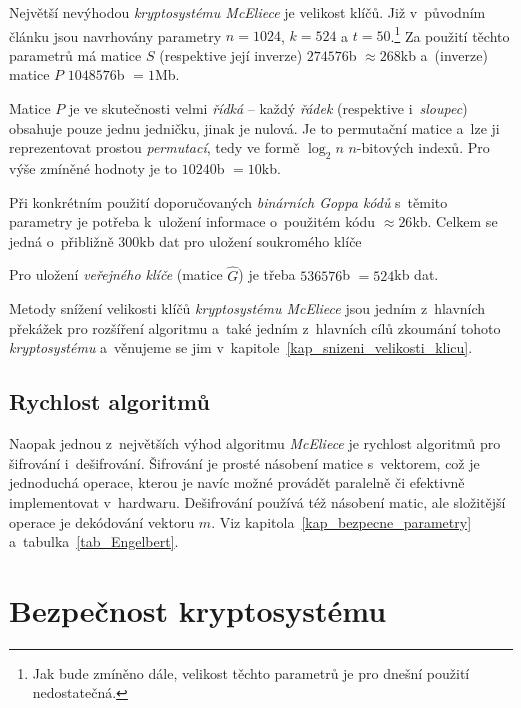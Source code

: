 \documentclass[thesis=M,czech,hidelinks]{FITthesis}[2012/06/26]
\newcommand{\0}{{\textcolor[gray]{0.75}{0}}}
\begin{document}
Největší nevýhodou \emph{kryptosystému McEliece} je velikost klíčů. Již
v~původním článku jsou navrhovány parametry $n=1024$, $k=524$ a
$t=50$.\footnote{
    Jak bude zmíněno dále, velikost těchto parametrů je pro dnešní použití
    nedostatečná.
} Za použití těchto parametrů má matice $S$ (respektive její inverze)
$274576$\;b $\approx 268$\;kb a~(inverze) matice $P$ $1048576$\;b $= 1$\;Mb.

Matice $P$ je ve skutečnosti velmi \emph{řídká} -- každý \emph{řádek}
(respektive i~\emph{sloupec}) obsahuje pouze jednu jedničku, jinak je nulová. Je
to permutační matice a~lze ji reprezentovat prostou \emph{permutací}, tedy ve
formě $\log_2 n$ $n$-bitových indexů. Pro výše zmíněné hodnoty je to $10240$\;b
$=10$\;kb.

Při konkrétním použití doporučovaných \emph{binárních Goppa kódů} s~těmito
parametry je potřeba k~uložení informace o~použitém kódu $\approx 26$\;kb.
Celkem se jedná o~přibližně $300$\;kb dat pro uložení soukromého klíče

Pro uložení \emph{veřejného klíče} (matice $\hat{G}$) je třeba $536576$\;b
$=524$\;kb dat.

Metody snížení velikosti klíčů \emph{kryptosystému McEliece} jsou jedním
z~hlavních překážek pro rozšíření algoritmu a~také jedním z~hlavních cílů
zkoumání tohoto \emph{kryptosystému} a~věnujeme se jim
v~kapitole~\ref{kap_snizeni_velikosti_klicu}.


\subsection{Rychlost algoritmů}

Naopak jednou z~největších výhod algoritmu \emph{McEliece} je rychlost algoritmů
pro šifrování i~dešifrování. Šifrování je prosté násobení matice s~vektorem, což
je jednoduchá operace, kterou je navíc možné provádět paralelně či efektivně
implementovat v~hardwaru. Dešifrování používá též násobení matic, ale složitější
operace je dekódování vektoru $\hat{m}$. Viz
kapitola~\ref{kap_bezpecne_parametry} a~tabulka~\ref{tab_Engelbert}.



\section{Bezpečnost kryptosystému}\label{kap_bezpecnost}
\end{document}
